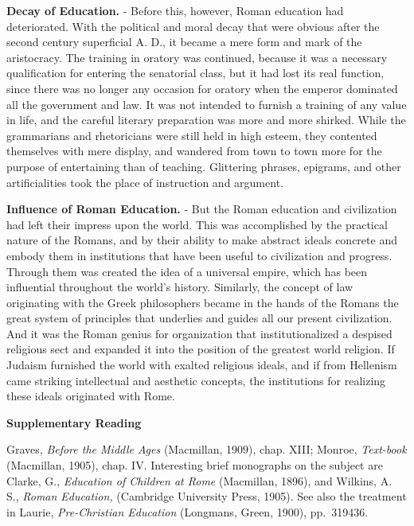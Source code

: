 \documentclass[]{book}
\begin{document}
\textbf{Decay of Education.} - Before this, however, Roman education had deteriorated. With the political and moral decay that were obvious after the second century superficial A. D., it became a mere form and mark of the aristocracy. The training in oratory was continued, because it was a necessary qualification for entering the senatorial class, but it had lost its real function, since there was no longer any occasion for oratory when the emperor dominated all the government and law. It was not intended to furnish a training of any value in life, and the careful literary preparation was more and more shirked. While the grammarians and rhetoricians were still held in high esteem, they contented themselves with mere display, and wandered from town to town more for the purpose of entertaining than of teaching. Glittering phrases, epigrams, and other artificialities took the place of instruction and argument.

\textbf{Influence of Roman Education.} - But the Roman education and civilization had left their impress upon the world. This was accomplished by the practical nature of the Romans, and by their ability to make abstract ideals concrete and embody them in institutions that have been useful to civilization and progress. Through them was created the idea of a universal empire, which has been influential throughout the world's history. Similarly, the concept of law originating with the Greek philosophers became in the hands of the Romans the great system of principles that underlies and guides all our present civilization. And it was the Roman genius for organization that institutionalized a despised religious sect and expanded it into the position of the greatest world religion. If Judaism furnished the world with exalted religious ideals, and if from Hellenism came striking intellectual and aesthetic concepts, the institutions for realizing these ideals originated with Rome.

\textbf{Supplementary Reading}

Graves, \emph{Before the Middle Ages} (Macmillan, 1909), chap. XIII; Monroe, \emph{Text-book} (Macmillan, 1905), chap. IV. Interesting brief monographs on the subject are Clarke, G., \emph{Education of Children at Rome} (Macmillan, 1896), and Wilkins, A. S., \emph{Roman Education,} (Cambridge University Press, 1905). See also the treatment in Laurie, \emph{Pre-Christian Education} (Longmans, Green, 1900), pp.~319436.


\end{document}
